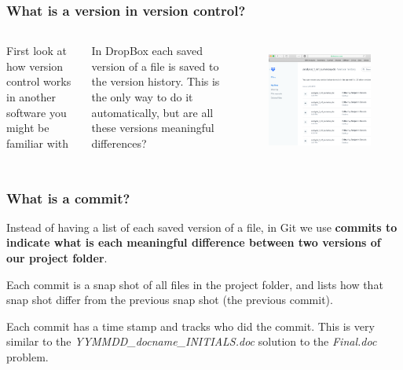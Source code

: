 \documentclass[aspectratio=169]{beamer} %
\begin{document}
\begin{frame}
\frametitle{What is a version in version control?}

	\begin{columns}[c]

		First look at how version control works in another software you might be familiar with

		\vspace{.5cm}

		In DropBox each saved version of a file is saved to the version history. This is the only way to do it automatically, but are all these versions meaningful differences?

		\begin{figure}
			\centering
			\includegraphics[width=1\linewidth]{../../Common-Resources/img/dropbox_versioncontrol}
			\label{fig:dropboxversioncontrol}
		\end{figure}

	\end{columns}


\end{frame}

\begin{frame}
\frametitle{What is a commit?}

	Instead of having a list of each saved version of a file, in Git we use \textbf{commits to indicate what is each meaningful difference between two versions of our project folder}.

	\vspace{.25cm}

	Each commit is a snap shot of all files in the project folder, and lists how that snap shot differ from the previous snap shot (the previous commit).

	\vspace{.25cm}

	Each commit has a time stamp and tracks who did the commit. This is very similar to the \textit{YYMMDD\_docname\_INITIALS.doc} solution to the \textit{Final.doc} problem.

\end{frame}
\end{document}
